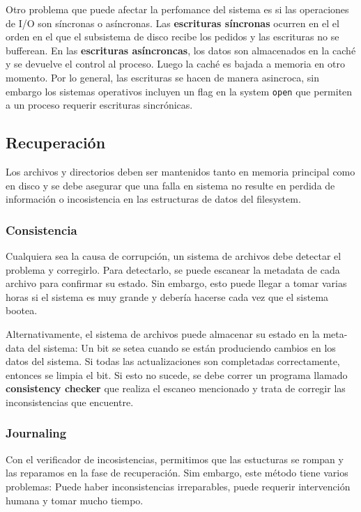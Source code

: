 Otro problema que puede afectar la perfomance del sistema es si las operaciones  de I/O son síncronas o asíncronas. Las \textbf{ escrituras síncronas} ocurren en el el orden en el que el subsistema de disco recibe los pedidos y las escrituras no se bufferean. En las \textbf{escrituras asíncroncas}, los datos son almacenados en la caché y se devuelve el control al proceso. Luego la caché es bajada a memoria en otro momento. Por lo general, las escrituras se hacen de manera asincroca, sin embargo los sistemas operativos incluyen un flag en la system \texttt{open} que permiten a un proceso requerir escrituras sincrónicas.

\subsection{Recuperación}
Los archivos y directorios deben ser mantenidos tanto en memoria principal como en disco y se debe asegurar que una falla en sistema no resulte en perdida de información o incosistencia en las estructuras de datos del filesystem.

\subsubsection{Consistencia}
Cualquiera sea la causa de corrupción, un sistema de archivos debe detectar el problema y corregirlo. Para detectarlo, se puede escanear la metadata de cada archivo para confirmar su estado. Sin embargo, esto puede llegar a tomar varias horas si el sistema es muy grande y debería hacerse cada vez que el sistema bootea.

Alternativamente, el sistema de archivos puede almacenar su estado en la meta-data del sistema:  Un bit se setea cuando se están produciendo cambios en los datos del sistema. Si todas las actualizaciones son completadas correctamente, entonces se limpia el bit. Si esto no sucede, se debe correr un programa llamado \textbf{consistency checker} que realiza el escaneo mencionado y trata de corregir las inconsistencias que encuentre.

\subsubsection{Journaling}
Con el verificador de incosistencias, permitimos que las estucturas se rompan y las reparamos en la fase de recuperación. Sim embargo, este método tiene varios problemas: Puede haber inconsistencias irreparables, puede requerir intervención humana y tomar mucho tiempo.

